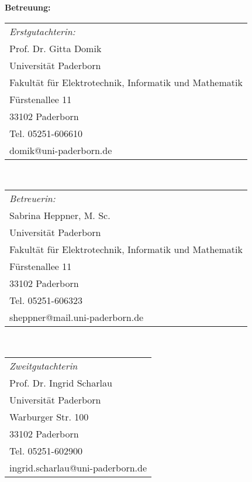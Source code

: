 
\clearpage
\textbf{Betreuung:}

\begin{tabular}{p{14cm}}\\
 \rule{0pt}{18pt}\textit{Erstgutachterin:} 		\\
 \rule{0pt}{14pt}Prof. Dr. Gitta Domik	\\
\rule{0pt}{14pt}Universität Paderborn	\\
Fakultät für Elektrotechnik, Informatik und Mathematik \\
Fürstenallee 11				\\
33102 Paderborn				\\
Tel. 05251-606610				\\
domik@uni-paderborn.de		 	
\end{tabular}\\ [0.1cm]


\begin{tabular}{p{14cm}}\\
 \rule{0pt}{18pt}\textit{Betreuerin:} 		\\
 \rule{0pt}{14pt}Sabrina Heppner, M. Sc.	\\
\rule{0pt}{14pt}Universität Paderborn	\\
Fakultät für Elektrotechnik, Informatik und Mathematik \\
Fürstenallee 11				\\
33102 Paderborn				\\
Tel. 05251-606323				\\
sheppner@mail.uni-paderborn.de	
\end{tabular}\\ [0.8cm]

\begin{tabular}{p{7cm}}
 \rule{0pt}{18pt}\textit{Zweitgutachterin} 		\\
 \rule{0pt}{14pt}Prof. Dr. Ingrid Scharlau	\\
\rule{0pt}{14pt}Universität Paderborn	\\
Warburger Str. 100				\\
33102 Paderborn					\\
Tel. 05251-602900				\\
 ingrid.scharlau@uni-paderborn.de				
\end{tabular}\\[0.4cm]
